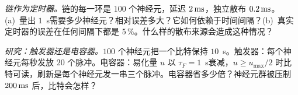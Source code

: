 \begin{exercise}[\lvlA]
\label{ex:02:6}
\emph{链作为定时器。}链的每一环是 $100$ 个神经元，延迟 $2\,\text{ms}$，独立散布 $0.2\,\text{ms}$。(a)~量出 $1$~s需要多少神经元？相对误差多大？它如何依赖于时间间隔？(b)~真实定时器的误差在任何间隔下都是 $5\,\%$。什么样的散布来源会造成这种情况？
\end{exercise}

\begin{exercise}[\lvlC]
\label{ex:02:7}
\emph{研究：触发器还是电容器。}$100$ 个神经元把一个比特保持 $10$~s。触发器：每个神经元每秒发放 $20$ 个脉冲。电容器：易化量 $u$ 以 $\tau_F=1$~s衰减，$u\ge u_{\max}/2$ 时比特可读，刷新是每个神经元发一串三个脉冲。电容器省多少倍？神经元群被压制 $200\,\text{ms}$ 后，比特会怎样？
\end{exercise}
